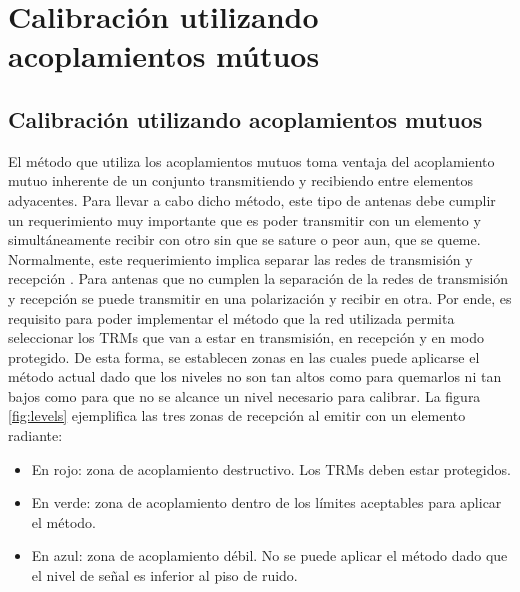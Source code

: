 \chapter{Calibración utilizando acoplamientos mútuos}
\label{ch:convertidores}

\section{Calibración utilizando acoplamientos mutuos}

El método que utiliza los acoplamientos mutuos toma ventaja del acoplamiento mutuo inherente de un conjunto transmitiendo
y recibiendo entre elementos adyacentes. Para llevar a cabo dicho método, este tipo de antenas debe cumplir un
requerimiento muy importante que es poder transmitir con un elemento y simultáneamente recibir con otro sin que se sature o peor
aun, que se queme. Normalmente, este requerimiento implica separar las redes de transmisión y recepción \cite{Gao2001}. Para 
antenas que no cumplen la separación de la redes de transmisión y recepción se puede transmitir en una polarización y recibir
en otra. Por ende, es requisito para poder implementar el método que la red utilizada permita seleccionar los TRMs que van a 
estar en transmisión, en recepción y en modo protegido. De esta forma, se establecen zonas en las cuales puede aplicarse el 
método actual dado que los niveles no son tan altos como para quemarlos ni tan bajos como para que no se alcance un nivel 
necesario para calibrar. La figura \ref{fig:levels} ejemplifica las tres zonas de recepción al emitir con un elemento radiante:
\begin{itemize}
	\item En rojo: zona de acoplamiento destructivo. Los TRMs deben estar protegidos.
	\item En verde: zona de acoplamiento dentro de los límites aceptables para aplicar el método.
	\item En azul: zona de acoplamiento débil. No se puede aplicar el método dado que el nivel de señal es inferior al piso de 
		ruido. 
\end{itemize}

